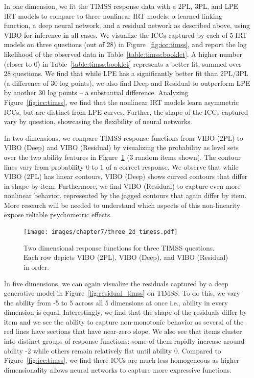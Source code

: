 In one dimension, we fit the TIMSS response data with a 2PL, 3PL, and LPE IRT models to compare to three nonlinear IRT models: a learned linking function, a deep neural network, and a residual network as described above, using VIBO for inference in all cases. 
We visualize the ICCs captured by each of 5 IRT models on three questions (out of 28) in Figure~\ref{fig:icc:timss}, and report the log likelihood of the observed data in Table~\ref{table:timss:booklet}.
A higher number (closer to 0) in Table~\ref{table:timss:booklet} represents a better fit, summed over 28 questions. We find that while LPE has a significantly better fit than 2PL/3PL (a difference of 30 log points), we also find Deep and Residual to outperform LPE by another 30 log points -- a substantial difference. 
Analyzing Figure~\ref{fig:icc:timss}, we find that the nonlinear IRT models learn asymmetric ICCs, but are distinct from LPE curves. Further, the shape of the ICCs captured vary by question, showcasing the flexibility of neural networks. 

In two dimensions, we compare TIMSS response functions from VIBO (2PL) to VIBO (Deep) and VIBO (Residual) by visualizing the probability as level sets over the two ability features in Figure~\ref{fig:surfaces_timss} (3 random items shown). The contour lines vary from probability 0 to 1 of a correct response. 
We observe that while VIBO (2PL) has linear contours, VIBO (Deep) shows  curved contours that differ in shape by item. Furthermore, we find VIBO (Residual) to capture even more nonlinear behavior, represented by the jagged contours that again differ by item.
More research will be needed to understand which aspects of this non-linearity expose reliable psychometric effects.

\begin{figure}
    \centering
    \texttt{[image: images/chapter7/three\_2d\_timess.pdf]}
    \caption{Two dimensional response functions for three TIMSS questions. Each row depicts VIBO (2PL), VIBO (Deep), and VIBO (Residual) in order. }
    \label{fig:surfaces_timss}
\end{figure}

In five dimensions, we can again visualize the residuals captured by a deep generative model in Figure~\ref{fig:residual_timss} on TIMSS. To do this, we vary the ability from -5 to 5 across all 5 dimensions at once i.e., ability in every dimension is equal.
Interestingly, we find that the shape of the residuals differ by item and we see the ability to capture non-monotonic behavior as several of the red lines have sections that have near-zero slope. We also see that items cluster into distinct groups of response functions: some of them rapidly increase around ability -2 while others remain relatively flat until ability 0.
Compared to Figure~\ref{fig:icc:timss}, we find there ICCs are much less homogeneous as higher dimensionality allows neural networks to capture more expressive functions. 

